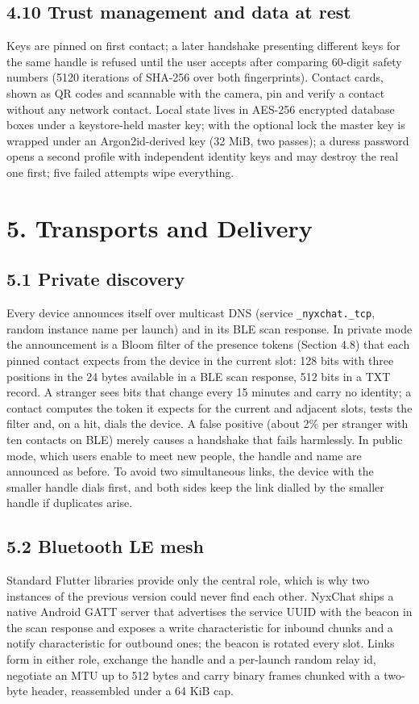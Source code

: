\documentclass[conference]{IEEEtran}
\begin{document}
\subsection{4.10 Trust management and data at rest}
Keys are pinned on first contact; a later handshake presenting different keys for the same handle is refused until the user accepts after comparing 60-digit safety numbers (5120 iterations of SHA-256 over both fingerprints). Contact cards, shown as QR codes and scannable with the camera, pin and verify a contact without any network contact. Local state lives in AES-256 encrypted database boxes under a keystore-held master key; with the optional lock the master key is wrapped under an Argon2id-derived key (32 MiB, two passes); a duress password opens a second profile with independent identity keys and may destroy the real one first; five failed attempts wipe everything.

\section{5. Transports and Delivery}
\subsection{5.1 Private discovery}
Every device announces itself over multicast DNS (service \texttt{\_nyxchat.\_tcp}, random instance name per launch) and in its BLE scan response. In private mode the announcement is a Bloom filter \cite{ref27} of the presence tokens (Section 4.8) that each pinned contact expects from the device in the current slot: 128 bits with three positions in the 24 bytes available in a BLE scan response, 512 bits in a TXT record. A stranger sees bits that change every 15 minutes and carry no identity; a contact computes the token it expects for the current and adjacent slots, tests the filter and, on a hit, dials the device. A false positive (about 2\% per stranger with ten contacts on BLE) merely causes a handshake that fails harmlessly. In public mode, which users enable to meet new people, the handle and name are announced as before. To avoid two simultaneous links, the device with the smaller handle dials first, and both sides keep the link dialled by the smaller handle if duplicates arise.

\subsection{5.2 Bluetooth LE mesh}
Standard Flutter libraries provide only the central role, which is why two instances of the previous version could never find each other. NyxChat ships a native Android GATT server that advertises the service UUID with the beacon in the scan response and exposes a write characteristic for inbound chunks and a notify characteristic for outbound ones; the beacon is rotated every slot. Links form in either role, exchange the handle and a per-launch random relay id, negotiate an MTU up to 512 bytes and carry binary frames chunked with a two-byte header, reassembled under a 64 KiB cap.
\end{document}
